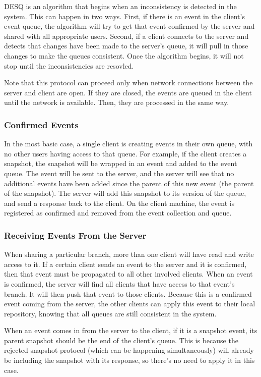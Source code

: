 DESQ is an algorithm that begins when an inconsistency is detected in the system. This can happen in two ways. First, if there is an event in the client's event queue, the algorithm will try to get that event confirmed by the server and shared with all appropriate users. Second, if a client connects to the server and detects that changes have been made to the server's queue, it will pull in those changes to make the queues consistent. Once the algorithm begins, it will not stop until the inconsistencies are resovled. 

Note that this protocol can proceed only when network connections between the server and client are open. If they are closed, the events are queued in the client until the network is available. Then, they are processed in the same way.

\subsubsection{Confirmed Events}

In the most basic case, a single client is creating events in their own queue, with no other users having access to that queue. For example, if the client creates a snapshot, the snapshot will be wrapped in an event and added to the event queue. The event will be sent to the server, and the server will see that no additional events have been added since the parent of this new event (the parent of the snapshot). The server will add this snapshot to its version of the queue, and send a response back to the client. On the client machine, the event is registered as confirmed and removed from the event collection and queue.

\subsubsection{Receiving Events From the Server}

When sharing a particular branch, more than one client will have read and write access to it. If a certain client sends an event to the server and it is confirmed, then that event must be propagated to all other involved clients. When an event is confirmed, the server will find all clients that have access to that event's branch. It will then push that event to those clients. Because this is a confirmed event coming from the server, the other clients can apply this event to their local repository, knowing that all queues are still consistent in the system.

When an event comes in from the server to the client, if it is a snapshot event, its parent snapshot should be the end of the client's queue. This is because the rejected snapshot protocol (which can be happening simultaneously) will already be including the snapshot with its response, so there's no need to apply it in this case. 

